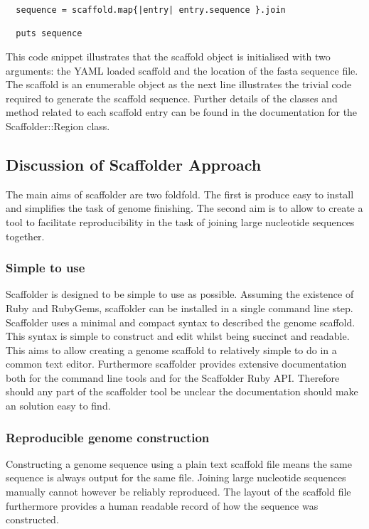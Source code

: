 \documentclass[10pt]{bmc_article}
\newenvironment{bmcformat}{\begin{raggedright}\baselineskip20pt\sloppy\setboolean{publ}{false}}{\end{raggedright}\baselineskip20pt\sloppy}
\begin{document}
\begin{bmcformat}
\begin{verbatim}
  sequence = scaffold.map{|entry| entry.sequence }.join

  puts sequence
\end{verbatim}

This code snippet illustrates that the scaffold object is initialised with two
arguments: the YAML loaded scaffold and the location of the fasta sequence
file. The scaffold is an enumerable object as the next line illustrates the
trivial code required to generate the scaffold sequence. Further details of
the classes and method related to each scaffold entry can be found in the
documentation for the Scaffolder::Region class. \pb

\subsection*{Discussion of Scaffolder Approach} %

The main aims of scaffolder are two foldfold. The first is produce easy to
install and simplifies the task of genome finishing. The second aim is to
allow to create a tool to facilitate reproducibility in the task of joining
large nucleotide sequences together. \pb

\subsubsection{Simple to use}

Scaffolder is designed to be simple to use as possible. Assuming the existence
of Ruby and RubyGems, scaffolder can be installed in a single command line
step. Scaffolder uses a minimal and compact syntax to described the genome
scaffold. This syntax is simple to construct and edit whilst being succinct
and readable. This aims to allow creating a genome scaffold to relatively
simple to do in a common text editor. Furthermore scaffolder provides
extensive documentation both for the command line tools and for the Scaffolder
Ruby API. Therefore should any part of the scaffolder tool be unclear the
documentation should make an solution easy to find. \pb

\subsubsection{Reproducible genome construction}

Constructing a genome sequence using a plain text scaffold file means the same
sequence is always output for the same file. Joining large nucleotide
sequences manually cannot however be reliably reproduced. The layout of the
scaffold file furthermore provides a human readable record of how the sequence
was constructed. \pb


\end{bmcformat}
\end{document}
